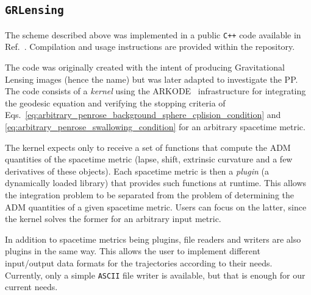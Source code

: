 \subsection{\texttt{GRLensing}}

The scheme described above was implemented in a public \texttt{C++} code available in Ref.~\cite{GRLensingRepo}. Compilation and usage instructions are provided within the repository.

The code was originally created with the intent of producing Gravitational Lensing images (hence the name) but was later adapted to investigate the PP. The code consists of a \emph{kernel} using the ARKODE~\cite{ARKODE} infrastructure for integrating the geodesic equation and verifying the stopping criteria of Eqs.~\eqref{eq:arbitrary_penrose_background_sphere_cplision_condition} and \eqref{eq:arbitrary_penrose_swallowing_condition} for an arbitrary spacetime metric.

The kernel expects only to receive a set of functions that compute the ADM quantities of the spacetime metric (lapse, shift, extrinsic curvature and a few derivatives of these objects). Each spacetime metric is then a \emph{plugin} (a dynamically loaded library) that provides such functions at runtime. This allows the integration problem to be separated from the problem of determining the ADM quantities of a given spacetime metric. Users can focus on the latter, since the kernel solves the former for an arbitrary input metric. 

In addition to spacetime metrics being plugins, file readers and writers are also plugins in the same way. This allows the user to implement different input/output data formats for the trajectories according to their needs. Currently, only a simple \texttt{ASCII} file writer is available, but that is enough for our current needs.

